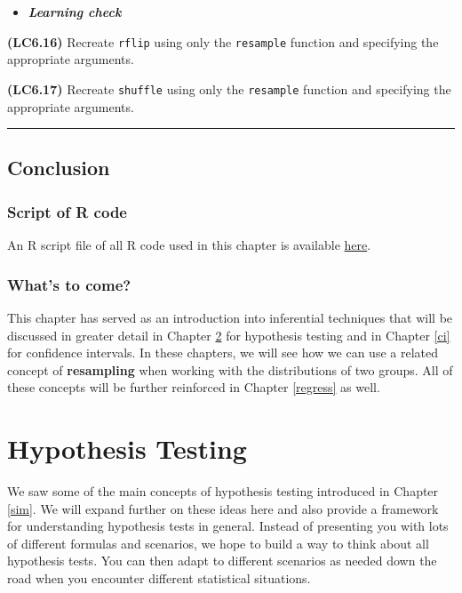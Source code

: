 \documentclass[]{tufte-book}
\let\oldrule=\rule
\renewcommand{\rule}[1]{\oldrule{\linewidth}}
\newenvironment{rmdblock}[1]
  {\begin{shaded*}
  \begin{itemize}
  \renewcommand{\labelitemi}{
    \raisebox{-.7\height}[0pt][0pt]{
    }
  }
  \item
  }
  {
  \end{itemize}
  \end{shaded*}
  }
\newenvironment{learncheck}
  {\begin{rmdblock}{warning}}
  {\end{rmdblock}}
\begin{document}
\begin{learncheck}
\textbf{\emph{Learning check}}
\end{learncheck}

\textbf{(LC6.16)} Recreate \texttt{rflip} using only the
\texttt{resample} function and specifying the appropriate arguments.

\textbf{(LC6.17)} Recreate \texttt{shuffle} using only the
\texttt{resample} function and specifying the appropriate arguments.

\begin{center}\rule{0.5\linewidth}{\linethickness}\end{center}

\section{Conclusion}\label{conclusion-2}

\subsection{Script of R code}\label{script-of-r-code-2}

An R script file of all R code used in this chapter is available
\href{http://ismayc.github.io/moderndiver-book/scripts/06-sim.R}{here}.

\subsection{What's to come?}\label{whats-to-come-3}

This chapter has served as an introduction into inferential techniques
that will be discussed in greater detail in Chapter \ref{hypo} for
hypothesis testing and in Chapter \ref{ci} for confidence intervals. In
these chapters, we will see how we can use a related concept of
\textbf{resampling} when working with the distributions of two groups.
All of these concepts will be further reinforced in Chapter
\ref{regress} as well.

\chapter{Hypothesis Testing}\label{hypo}

We saw some of the main concepts of hypothesis testing introduced in
Chapter \ref{sim}. We will expand further on these ideas here and also
provide a framework for understanding hypothesis tests in general.
Instead of presenting you with lots of different formulas and scenarios,
we hope to build a way to think about all hypothesis tests. You can then
adapt to different scenarios as needed down the road when you encounter
different statistical situations.
\end{document}
